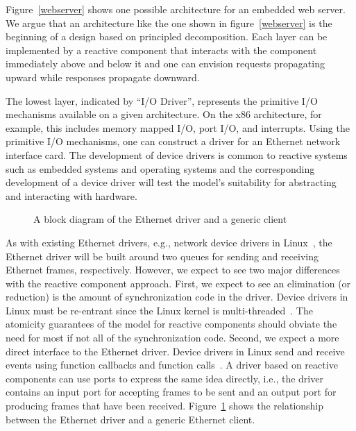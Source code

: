 Figure~\ref{webserver} shows one possible architecture for an embedded web server.
We argue that an architecture like the one shown in figure~\ref{webserver} is the beginning of a design based on principled decomposition.
Each layer can be implemented by a reactive component that interacts with the component immediately above and below it and one can envision requests propagating upward while responses propagate downward.

The lowest layer, indicated by ``I/O Driver'', represents the primitive I/O mechanisms available on a given architecture.
On the x86 architecture, for example, this includes memory mapped I/O, port I/O, and interrupts.
Using the primitive I/O mechanisms, one can construct a driver for an Ethernet network interface card.
The development of device drivers is common to reactive systems such as embedded systems and operating systems and the corresponding development of a device driver will test the model's suitability for abstracting and interacting with hardware.

\begin{figure}
{

\centerline{\box\graph}
}
\caption{A block diagram of the Ethernet driver and a generic client\label{ethernet}}
\end{figure}

As with existing Ethernet drivers, e.g., network device drivers in Linux~\cite{corbet2005linux}, the Ethernet driver will be built around two queues for sending and receiving Ethernet frames, respectively.
However, we expect to see two major differences with the reactive component approach.
First, we expect to see an elimination (or reduction) is the amount of synchronization code in the driver.
Device drivers in Linux must be re-entrant since the Linux kernel is multi-threaded~\cite{corbet2005linux}.
The atomicity guarantees of the model for reactive components should obviate the need for most if not all of the synchronization code.
Second, we expect a more direct interface to the Ethernet driver.
Device drivers in Linux send and receive events using function callbacks and function calls~\cite{corbet2005linux}.
A driver based on reactive components can use ports to express the same idea directly, i.e., the driver contains an input port for accepting frames to be sent and an output port for producing frames that have been received.
Figure~\ref{ethernet} shows the relationship between the Ethernet driver and a generic Ethernet client.

